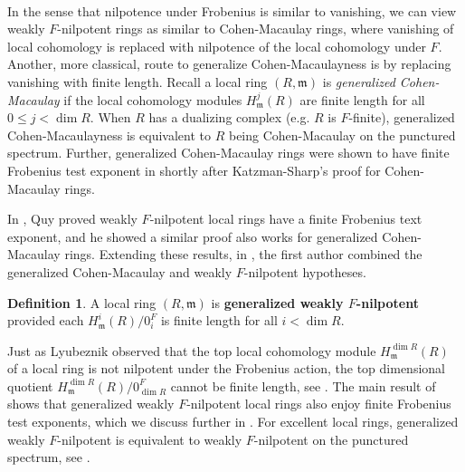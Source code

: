\documentclass{amsproc}
\theoremstyle{definition}
\newtheorem{definition}[theorem]{Definition}
\theoremstyle{remark}
\numberwithin{equation}{section}
\newcommand{\fm}{\mathfrak{m}}
\begin{document}
\

 In the sense that nilpotence under Frobenius is similar to vanishing, we can view weakly $F$-nilpotent rings as similar to Cohen-Macaulay rings, where vanishing of local cohomology is replaced with nilpotence of the local cohomology under $F$. Another, more classical, route to generalize Cohen-Macaulayness is by replacing vanishing with finite length. Recall a local ring $(R,\fm)$ is \textit{generalized Cohen-Macaulay} if the local cohomology modules $H^j_\fm(R)$ are finite length for all $0 \le j < \dim R$. When $R$ has a dualizing complex (e.g. $R$ is $F$-finite), generalized Cohen-Macaulayness is equivalent to $R$ being Cohen-Macaulay on the punctured spectrum. Further, generalized Cohen-Macaulay rings were shown to have finite Frobenius test exponent in \cite{HKSY06} shortly after Katzman-Sharp's proof for Cohen-Macaulay rings. 

In \cite[Main Thm]{Quy19}, Quy proved weakly $F$-nilpotent local rings have a finite Frobenius text exponent, and he showed a similar proof also works for   generalized Cohen-Macaulay rings. Extending these results, in \cite{Mad19}, the first author combined the generalized Cohen-Macaulay and weakly $F$-nilpotent hypotheses.

\begin{definition} A local ring $(R,\fm)$ is {\bf generalized weakly $F$-nilpotent} provided each $H_\fm^i(R)/0_i^F$ is finite length for all $i < \dim R$. 
\end{definition}

Just as Lyubeznik observed that the top local cohomology module $H^{\dim R}_{\fm}(R)$ of a local ring is not nilpotent under the Frobenius action, the top dimensional quotient $H^{\dim R}_\fm(R)/0^F_{\dim R}$ cannot be finite length, see \cite[Lem. 3.4.(c)]{MM24}. The main result of \cite{Mad19} shows that generalized weakly $F$-nilpotent local rings also enjoy finite Frobenius test exponents, which we discuss further in . For excellent local rings, generalized weakly $F$-nilpotent is equivalent to weakly $F$-nilpotent on the punctured spectrum, see \cite[Prop. 4.6]{KMPS23}.
\end{document}
